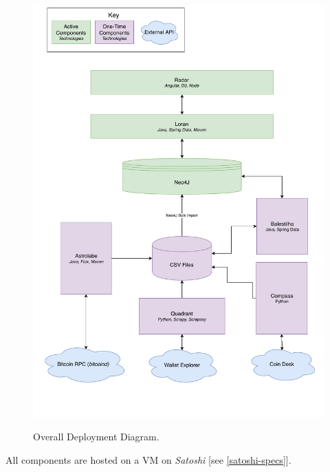 \begin{figure}[h!]
  \centering
  \includegraphics[width = 15cm]{./figures/overalldeployment}\\[0.5cm] 
  \caption{Overall Deployment Diagram.}
  \label{fig:overall-deployment}
\end{figure}

All components are hosted on a VM on \textit{Satoshi} [see \ref{satoshi-specs}].

